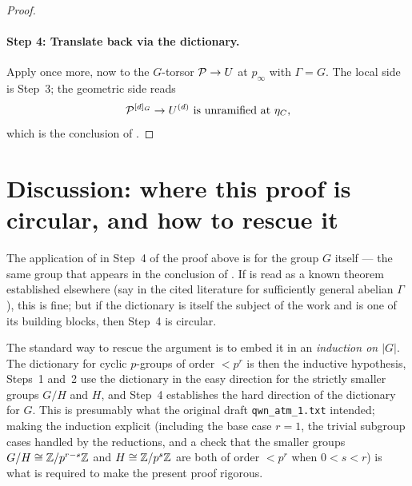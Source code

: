\documentclass[11pt]{article}
\begin{document}
\begin{proof}
\paragraph{Step 4: Translate back via the dictionary.}
Apply  once more, now to the $G$-torsor $\mathcal{P} \to U$ at
$p_\infty$ with $\Gamma = G$. The local side is Step~3; the geometric side
reads
\[
\mathcal{P}^{[d]_G} \to U^{(d)} \text{ is unramified at } \eta_C,
\]
which is the conclusion of . \qedhere
\end{proof}

\section{Discussion: where this proof is circular, and how to rescue it}\label{sec:discussion}

\begin{remark}\label{rem:circularity}
The application of  in Step~4 of the proof above is for
the group $G$ itself --- the same group that appears in the conclusion of
. If  is read as a known theorem
established elsewhere (say in the cited literature for sufficiently general
abelian $\Gamma$), this is fine; but if the dictionary is itself the subject of
the work and  is one of its building blocks, then Step~4 is
circular.

The standard way to rescue the argument is to embed it in an \emph{induction on
$|G|$}. The dictionary for cyclic $p$-groups of order $< p^r$ is then the
inductive hypothesis, Steps~1 and~2 use the dictionary in the easy direction
for the strictly smaller groups $G/H$ and $H$, and Step~4 establishes the hard
direction of the dictionary for $G$. This is presumably what the original
draft \texttt{qwn\_atm\_1.txt} intended; making the induction explicit
(including the base case $r = 1$, the trivial subgroup cases handled by the
reductions, and a check that the smaller groups $G/H \cong \mathbb{Z}/p^{r-s}\mathbb{Z}$ and
$H \cong \mathbb{Z}/p^s\mathbb{Z}$ are both of order $< p^r$ when $0 < s < r$) is what is
required to make the present proof rigorous.
\end{remark}
\end{document}
